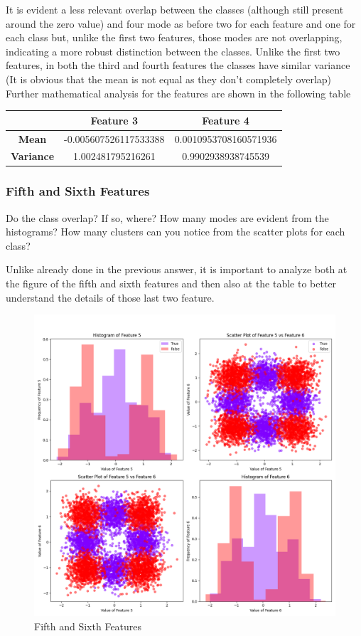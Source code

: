 \documentclass[a4paper, 12pt, english]{article}
\begin{document}
    It is evident a less relevant overlap between the classes (although still present around the zero value) and four mode as before two for each feature and one for each class but, unlike the first two features, those modes are not overlapping, indicating a more robust distinction between the classes. Unlike the first two features, in both the third and fourth features the classes have similar variance (It is obvious that the mean is not equal as they don't completely overlap)
    Further mathematical analysis for the features are shown in the following table
    \begin{table}[htbp]
        \centering
        \begin{tabular}{|c|c|c|}
            \hline
            & \textbf{Feature 3}    & \textbf{Feature 4}    \\
            \hline
            \textbf{Mean}     & -0.005607526117533388 & 0.0010953708160571936 \\
            \hline
            \textbf{Variance} & 1.002481795216261     & 0.9902938938745539    \\
            \hline
        \end{tabular}
    \end{table}

    \subsubsection{Fifth and Sixth Features}
    \label{project1:3}

    Do the class overlap? If so, where? How many modes are evident from the histograms? How many clusters can you notice from the scatter plots for each class?

    Unlike already done in the previous answer, it is important to analyze both at the figure of the fifth and sixth features and then also at the table to better understand the details of those last two feature.

    \begin{figure}[h]
        \centering
        \includegraphics[width=0.7\linewidth]{img/projects/project1/5-6.png}
        \caption{Fifth and Sixth Features}
        \label{fig:project1_5-6}
    \end{figure}
\end{document}
